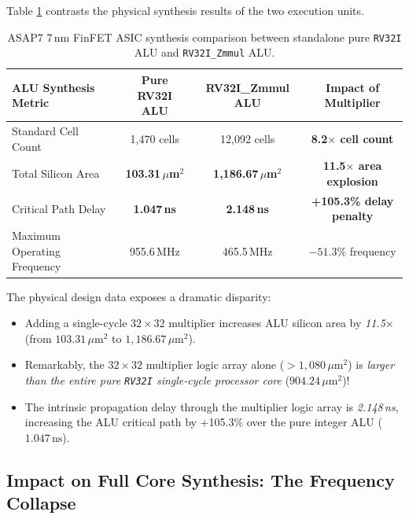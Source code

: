 Table \ref{tab:alu_synthesis_comparison} contrasts the physical synthesis results of the two execution units.

\begin{table}[htbp]
\centering
\small
\begin{tabular}{|l|c|c|c|}
\hline
\textbf{ALU Synthesis Metric} & \textbf{Pure RV32I ALU} & \textbf{RV32I\_Zmmul ALU} & \textbf{Impact of Multiplier} \\
\hline
Standard Cell Count          & 1,470 cells            & 12,092 cells             & \textbf{8.2$\times$ cell count} \\
Total Silicon Area           & \textbf{103.31\,$\mu$m$^2$} & \textbf{1,186.67\,$\mu$m$^2$} & \textbf{11.5$\times$ area explosion} \\
Critical Path Delay          & \textbf{1.047\,ns}      & \textbf{2.148\,ns}       & \textbf{+105.3\% delay penalty} \\
Maximum Operating Frequency  & 955.6\,MHz             & 465.5\,MHz               & $-51.3\%$ frequency \\
\hline
\end{tabular}
\caption{ASAP7 7\,nm FinFET ASIC synthesis comparison between standalone pure \texttt{RV32I} ALU and \texttt{RV32I\_Zmmul} ALU.}\label{tab:alu_synthesis_comparison}
\end{table}

The physical design data exposes a dramatic disparity:
\begin{itemize}
    \item Adding a single-cycle $32 \times 32$ multiplier increases ALU silicon area by \textit{11.5$\times$} (from $103.31\,\mu\text{m}^2$ to $1,186.67\,\mu\text{m}^2$).
    \item Remarkably, the $32 \times 32$ multiplier logic array alone ($>1,080\,\mu\text{m}^2$) is \textit{larger than the entire pure \texttt{RV32I} single-cycle processor core} ($904.24\,\mu\text{m}^2$)!
    \item The intrinsic propagation delay through the multiplier logic array is \textit{2.148\,ns}, increasing the ALU critical path by +105.3\% over the pure integer ALU ($1.047\,\text{ns}$).
\end{itemize}

\subsection{Impact on Full Core Synthesis: The Frequency Collapse}

